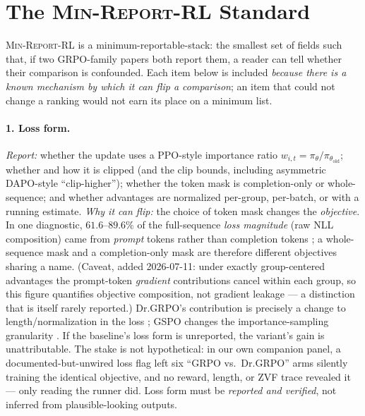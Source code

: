 \documentclass[11pt]{article}
\newcommand{\minreport}{\textsc{Min-Report-RL}}
\begin{document}
\section{The \minreport{} Standard}
\label{sec:standard}

\minreport{} is a minimum-reportable-stack: the smallest set of fields such
that, if two GRPO-family papers both report them, a reader can tell whether
their comparison is confounded. Each item below is included \emph{because there
is a known mechanism by which it can flip a comparison}; an item that could not
change a ranking would not earn its place on a minimum list.

\paragraph{1. Loss form.}
\emph{Report:} whether the update uses a PPO-style importance ratio
$w_{i,t}=\pi_\theta/\pi_{\theta_{\text{old}}}$; whether and how it is clipped
(and the clip bounds, including asymmetric DAPO-style ``clip-higher'');
whether the token mask is completion-only or whole-sequence; and whether
advantages are normalized per-group, per-batch, or with a running estimate.
\emph{Why it can flip:} the choice of token mask changes the
\emph{objective}. In one diagnostic, $61.6$--$89.6\%$ of the full-sequence
\emph{loss magnitude} (raw NLL composition) came from \emph{prompt} tokens
rather than completion tokens \cite{zvfaudit2026}; a whole-sequence mask and
a completion-only mask are therefore different objectives sharing a name.
(Caveat, added 2026-07-11: under exactly group-centered advantages the
prompt-token \emph{gradient} contributions cancel within each group, so this
figure quantifies objective composition, not gradient leakage --- a
distinction that is itself rarely reported.) Dr.GRPO's contribution is
precisely a change to length/normalization in the loss \cite{tong2025drgrpo}; GSPO
changes the importance-sampling granularity \cite{qwen2025gspo}. If the baseline's
loss form is unreported, the variant's gain is unattributable. The stake is not
hypothetical: in our own companion panel, a documented-but-unwired loss flag
left six ``GRPO vs.\ Dr.GRPO'' arms silently training the identical objective,
and no reward, length, or ZVF trace revealed it --- only reading the runner
did. Loss form must be \emph{reported and verified}, not inferred from
plausible-looking outputs.
\end{document}
